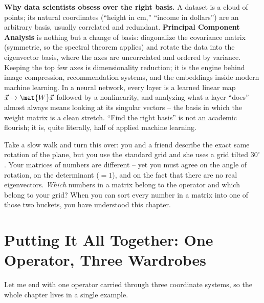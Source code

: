 \begin{applicationbox}
\textbf{Why data scientists obsess over the right basis.} A dataset is a cloud of
points; its natural coordinates (``height in cm,'' ``income in dollars'') are an
arbitrary basis, usually correlated and redundant. \textbf{Principal Component
Analysis} is nothing but a change of basis: diagonalize the covariance matrix
(symmetric, so the spectral theorem applies) and rotate the data into the
eigenvector basis, where the axes are uncorrelated and ordered by variance. Keeping
the top few axes is dimensionality reduction; it is the engine behind image
compression, recommendation systems, and the embeddings inside modern machine
learning. In a neural network, every layer is a learned linear map
$\vec{x}\mapsto\mat{W}\vec{x}$ followed by a nonlinearity, and analyzing what a
layer ``does'' almost always means looking at its singular vectors -- the basis in
which the weight matrix is a clean stretch. ``Find the right basis'' is not an
academic flourish; it is, quite literally, half of applied machine learning.
\end{applicationbox}

\begin{walkbox}
Take a slow walk and turn this over: you and a friend describe the exact same
rotation of the plane, but you use the standard grid and she uses a grid tilted
$30^\circ$. Your matrices of numbers are different -- yet you must agree on the
angle of rotation, on the determinant ($=1$), and on the fact that there are no
real eigenvectors. \emph{Which} numbers in a matrix belong to the operator and
which belong to your grid? When you can sort every number in a matrix into one of
those two buckets, you have understood this chapter.
\end{walkbox}

\section{Putting It All Together: One Operator, Three Wardrobes}
\label{ch31:capstone}

Let me end with one operator carried through three coordinate systems, so the
whole chapter lives in a single example.

